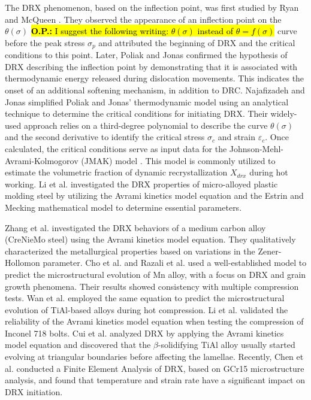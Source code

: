 \documentclass[metals,article,submit,pdftex,moreauthors]{Definitions/mdpi}
\makeatletter
\DeclareRobustCommand{\eal}{et al.\@\xspace}
\DeclareRobustCommand{\OP}[1]{\begingroup\sethlcolor{VWyellow}\textcolor{red}{\hl{\textbf{O.P.:} #1}}\endgroup}
\makeatother
\begin{document}
The DRX phenomenon, based on the inflection point, was first studied by Ryan and McQueen \cite{ryan1989dynamic, ryan1990dynamic, ryan1990flow}.
They observed the appearance of an inflection point on the $\theta(\sigma)$ \OP{I suggest the following writing: $\theta(\sigma)$ instead of $\theta=f(\sigma)$} curve before the peak stress $\sigma_p$ and attributed the beginning of DRX and the critical conditions to this point.
Later, Poliak and Jonas \cite{Poliak-1996,ei2003initiation,ei2003critical,jonas2003critical} confirmed the hypothesis of DRX describing the inflection point by demonstrating that it is associated with thermodynamic energy released during dislocation movements.
This indicates the onset of an additional softening mechanism, in addition to DRC.
Najafizadeh and Jonas \cite{najafizadeh2006predicting} simplified Poliak and Jonas' thermodynamic model using an analytical technique to determine the critical conditions for initiating DRX.
Their widely-used approach relies on a third-degree polynomial to describe the curve $\theta(\sigma)$ and the second derivative to identify the critical stress $\sigma_c$ and strain $\varepsilon_c$.
Once calculated, the critical conditions serve as input data for the Johnson-Mehl-Avrami-Kolmogorov (JMAK) model \cite{Avrami-1939}.
This model is commonly utilized to estimate the volumetric fraction of dynamic recrystallization $X_{drx}$ during hot working.
Li \eal \cite{li2015experimental} investigated the DRX properties of micro-alloyed plastic molding steel by utilizing the Avrami kinetics model equation and the Estrin and Mecking mathematical model \cite{estrin1984unified,mecking1981kinetics} to determine essential parameters.

Zhang \eal \cite{zhang2016kinetics} investigated the DRX behaviors of a medium carbon alloy (CreNieMo steel) using the Avrami kinetics model equation.
They qualitatively characterized the metallurgical properties based on variations in the Zener-Hollomon parameter.
Cho \eal \cite{cho2005prediction} and Razali \eal \cite{razali2021new} used a well-established model to predict the microstructural evolution of Mn alloy, with a focus on DRX and grain growth phenomena.
Their results showed consistency with multiple compression tests.
Wan \eal \cite{wan2017experimental} employed the same equation to predict the microstructural evolution of TiAl-based alloys during hot compression.
Li \eal \cite{li2018finite} validated the reliability of the Avrami kinetics model equation when testing the compression of Inconel 718 bolts.
Cui \eal \cite{cui2016hot} analyzed DRX by applying the Avrami kinetics model equation and discovered that the $\beta$-solidifying TiAl alloy usually started evolving at triangular boundaries before affecting the lamellae.
Recently, Chen \eal \cite{chen2023finite} conducted a Finite Element Analysis of DRX, based on GCr15 microstructure analysis, and found that temperature and strain rate have a significant impact on DRX initiation.
\end{document}
